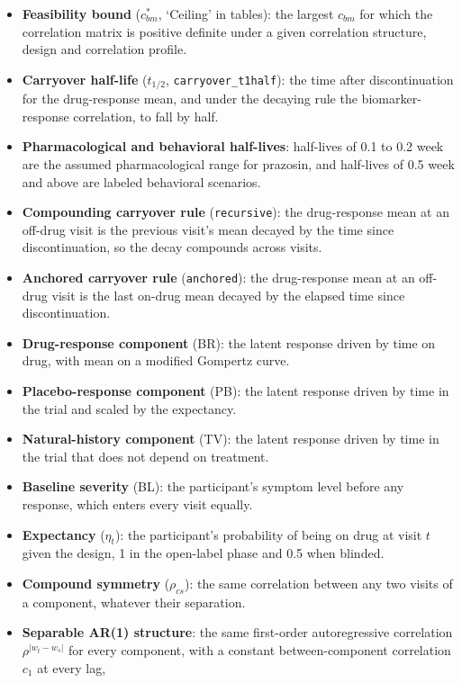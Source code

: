 \documentclass[
  11pt,
]{article}
\begin{document}
\begin{itemize}
\item
  \textbf{Feasibility bound} (\(c_{bm}^{*}\), `Ceiling' in tables): the
  largest \(c_{bm}\) for which the correlation matrix is positive
  definite under a given correlation structure, design and
  correlation profile.
\item
  \textbf{Carryover half-life} (\(t_{1/2}\), \texttt{carryover\_t1half}): the time
  after discontinuation for the drug-response mean, and under the
  decaying rule the biomarker-response correlation, to fall by half.
\item
  \textbf{Pharmacological and behavioral half-lives}: half-lives of 0.1 to
  0.2 week are the assumed pharmacological range for prazosin, and
  half-lives of 0.5 week and above are labeled behavioral scenarios.
\item
  \textbf{Compounding carryover rule} (\texttt{recursive}): the drug-response mean at
  an off-drug visit is the previous visit's mean decayed by the time
  since discontinuation, so the decay compounds across visits.
\item
  \textbf{Anchored carryover rule} (\texttt{anchored}): the drug-response mean at
  an off-drug visit is the last on-drug mean decayed by the elapsed
  time since discontinuation.
\item
  \textbf{Drug-response component} (BR): the latent response driven by time
  on drug, with mean on a modified Gompertz curve.
\item
  \textbf{Placebo-response component} (PB): the latent response driven by
  time in the trial and scaled by the expectancy.
\item
  \textbf{Natural-history component} (TV): the latent response driven by
  time in the trial that does not depend on treatment.
\item
  \textbf{Baseline severity} (BL): the participant's symptom level before
  any response, which enters every visit equally.
\item
  \textbf{Expectancy} (\(\eta_t\)): the participant's probability of being on
  drug at visit \(t\) given the design, 1 in the open-label phase and
  0.5 when blinded.
\item
  \textbf{Compound symmetry} (\(\rho_{cs}\)): the same correlation between
  any two visits of a component, whatever their separation.
\item
  \textbf{Separable AR(1) structure}: the same first-order autoregressive
  correlation \(\rho^{\lvert w_t - w_s\rvert}\) for every component,
  with a constant between-component correlation \(c_1\) at every lag,

\end{itemize}
\end{document}
